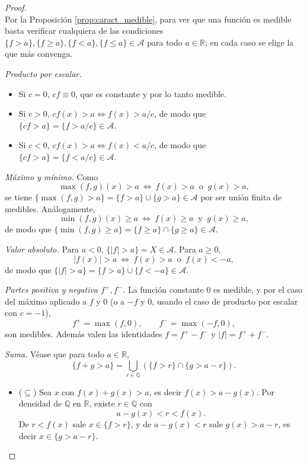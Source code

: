 \documentclass[11pt, a4paper]{article}
\begin{document}
\begin{proof}\leavevmode\\
Por la Proposición \ref{prop:caract_medible}, para ver que una función es medible basta
verificar cualquiera de las condiciones $\{f > a\}, \{f \ge a\}, \{f < a\}, \{f \le a\} \in
\mathcal{A}$ para todo $a \in \mathbb{R}$; en cada caso se elige la que más convenga.

\textit{Producto por escalar.}
\begin{itemize}
    \item Si $c = 0$, $cf \equiv 0$, que es constante y por lo tanto medible.
    \item Si $c > 0$, $cf(x) > a \Leftrightarrow f(x) > a/c$, de modo que
    $\{cf > a\} = \{f > a/c\} \in \mathcal{A}$.
    \item Si $c < 0$, $cf(x) > a \Leftrightarrow f(x) < a/c$, de modo que 
    $\{cf > a\} = \{f < a/c\} \in \mathcal{A}$.
\end{itemize}

\textit{Máximo y mínimo.} Como
$$ \max(f, g)(x) > a \ \Leftrightarrow \ f(x) > a \ \text{ o } \ g(x) > a, $$
se tiene $\{\max(f, g) > a\} = \{f > a\} \cup \{g > a\} \in \mathcal{A}$ por ser unión finita
de medibles. Análogamente,
$$ \min(f, g)(x) \ge a \ \Leftrightarrow \ f(x) \ge a \ \text{ y } \ g(x) \ge a, $$
de modo que $\{\min(f, g) \ge a\} = \{f \ge a\} \cap \{g \ge a\} \in \mathcal{A}$.

\textit{Valor absoluto.} Para $a < 0$, $\{|f| > a\} = X \in \mathcal{A}$. Para $a \ge 0$,
$$ |f(x)| > a \ \Leftrightarrow \ f(x) > a \ \text{ o } \ f(x) < -a, $$
de modo que $\{|f| > a\} = \{f > a\} \cup \{f < -a\} \in \mathcal{A}$.

\textit{Partes positiva y negativa $f^+, f^-$.} La función constante $0$ es medible, y por el
caso del máximo aplicado a $f$ y $0$ (o a $-f$ y $0$, usando el caso de producto por escalar con
$c = -1$),
$$ f^+ = \max(f, 0), \qquad f^- = \max(-f, 0), $$
son medibles. Además valen las identidades $f = f^+ - f^-$ y $|f| = f^+ + f^-$.

\textit{Suma.} Véase que para todo $a \in \mathbb{R}$,
$$ \{f + g > a\} = \bigcup_{r \in \mathbb{Q}} \left( \{f > r\} \cap \{g > a - r\} \right). $$
\begin{itemize}
    \item ($\subseteq$) Sea $x$ con $f(x) + g(x) > a$, es decir $f(x) > a - g(x)$. Por densidad de
    $\mathbb{Q}$ en $\mathbb{R}$, existe $r \in \mathbb{Q}$ con
    $$ a - g(x) < r < f(x). $$
    De $r < f(x)$ sale $x \in \{f > r\}$, y de $a - g(x) < r$ sale $g(x) > a - r$, es decir $x \in
    \{g > a - r\}$.


\end{itemize}
\end{proof}
\end{document}
